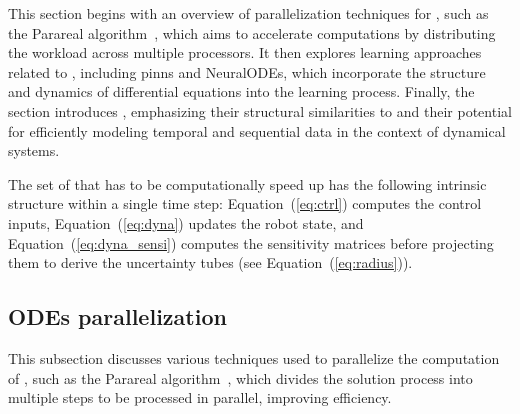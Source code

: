This section begins with an overview of parallelization techniques for , such as the Parareal algorithm~\cite{cParareal}, which aims to accelerate computations by distributing the workload across multiple processors. 
It then explores learning approaches related to , including \gls{pinns} and NeuralODEs, which incorporate the structure and dynamics of differential equations into the learning process. 
Finally, the section introduces , emphasizing their structural similarities to  and their potential for efficiently modeling temporal and sequential data in the context of dynamical systems.

The set of  that has to be computationally speed up has the following intrinsic structure within a single time step: Equation~(\ref{eq:ctrl}) computes the control inputs, Equation~(\ref{eq:dyna}) updates the robot state, and Equation~(\ref{eq:dyna_sensi}) computes the sensitivity matrices before projecting them to derive the uncertainty tubes (see Equation~(\ref{eq:radius})). 

\subsection{ODEs parallelization}

This subsection discusses various techniques used to parallelize the computation of , such as the Parareal algorithm~\cite{cParareal}, which divides the solution process into multiple steps to be processed in parallel, improving efficiency.

